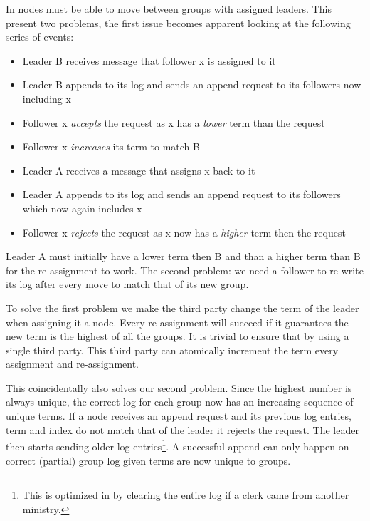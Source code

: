 In \name{} nodes must be able to move between groups with assigned leaders. This present two problems, the first issue becomes apparent looking at the following series of events:
\begin{itemize}
	\item Leader B receives message that follower x is assigned to it
	\item Leader B appends to its log and sends an append request to its followers now including x
	\item Follower x \emph{accepts} the request as x has a \emph{lower} term than the request
	\item Follower x \emph{increases} its term to match B
	\item Leader A receives a message that assigns x back to it
	\item Leader A appends to its log and sends an append request to its followers which now again includes x
	\item Follower x \emph{rejects} the request as x now has a \emph{higher} term then the request
\end{itemize}
Leader A must initially have a lower term then B and than a higher term than B for the re-assignment to work. The second problem: we need a follower to re-write its log after every move to match that of its new group. 

To solve the first problem we make the third party change the term of the leader when assigning it a node. Every re-assignment will succeed if it guarantees the new term is the highest of all the groups. It is trivial to ensure that by using a single third party. This third party can atomically increment the term every assignment and re-assignment. 

This coincidentally also solves our second problem. Since the highest number is always unique, the correct log for each group now has an increasing sequence of unique terms. If a node receives an append request and its previous log entries, term and index do not match that of the leader it rejects the request. The leader then starts sending older log entries\footnote{This is optimized in \name{} by clearing the entire log if a clerk came from another ministry.}. A successful append can only happen on correct (partial) group log given terms are now unique to groups.
